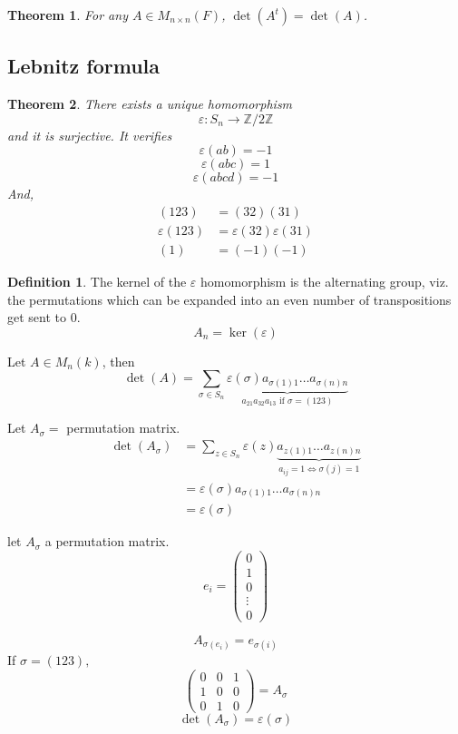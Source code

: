 \documentclass[12pt]{article}
\newtheorem{theorem}{Theorem}[section]
\theoremstyle{definition}
\newtheorem{definition}{Definition}[section]
\theoremstyle{remark}
\begin{document}
\begin{theorem}
    For any $A \in M_{n\times n} (F )$, $\det(A^t) = \det(A) $.
\end{theorem}

\subsection{Lebnitz formula}
\begin{theorem}
    There exists a unique homomorphism
    $$\varepsilon: S_n \rightarrow \mathbb{Z}/2\mathbb{Z}$$
    and it is surjective. It verifies
    $$\varepsilon (ab) = -1$$
    $$\varepsilon (abc) = 1$$
    $$\varepsilon (abcd) =-1$$
    And, 
    \begin{align*}
        (123)&=(32)(31) \\
        \varepsilon(123)&= \varepsilon(32) \varepsilon(31) \\
        (1)&=(-1)(-1)
    \end{align*}
\end{theorem}
\begin{definition}
    The kernel of the $\varepsilon$ homomorphism is the alternating group, viz. the permutations which can be expanded into 
    an even number of transpositions get sent to 0. 
    $$A_n = \ker(\varepsilon)$$
\end{definition}
Let $A\in M_n(k)$, then 
$$\det(A) = \sum_{\sigma \in S_n} \underbrace{\varepsilon(\sigma) a_{\sigma(1)1} \hdots a_{\sigma(n)n}}_{a_{21} a_{32} a_{13} \text{ if $\sigma = (123)$}}$$
\begin{example}
    Let $A_\sigma = $ permutation matrix. 
    \begin{align*}\det(A_\sigma) &= \sum_{z \in S_n} \varepsilon(z) \underbrace{a_{z(1)1}\hdots a_{z(n)n}}_{a_{ij} = 1 \iff \sigma(j) = 1} \\ 
            &= \varepsilon(\sigma ) a_{\sigma(1)1} \hdots a_{\sigma(n)n}\\
            &= \varepsilon (\sigma)
    \end{align*}
\end{example}
\begin{example}
    let $A_\sigma$ a permutation matrix. 
    $$e_i = \begin{pmatrix}
        0\\1\\0\\\vdots \\0
    \end{pmatrix}$$

    $$A_{\sigma(e_i)}= e_{\sigma(i)}$$
    If $\sigma = (123),$
    $$\begin{pmatrix}
        0&0&1\\1&0&0\\0&1&0
    \end{pmatrix} = A_\sigma $$
    $$\det(A_\sigma) = \varepsilon(\sigma)$$
\end{example}
\end{document}
